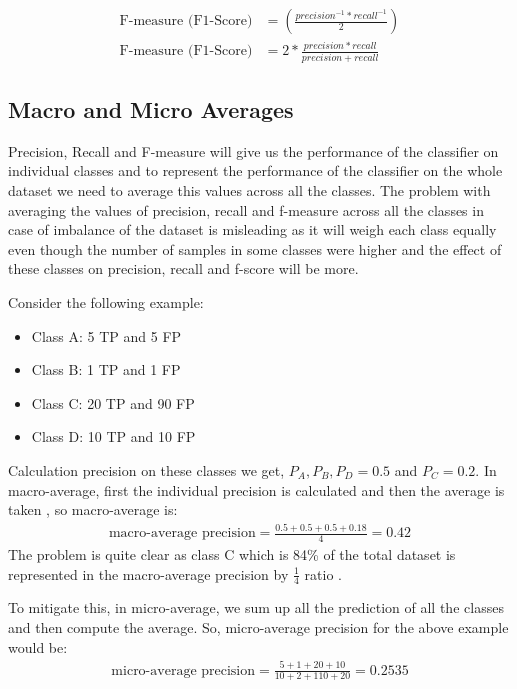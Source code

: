 \begin{align}
    \text{F-measure (F1-Score)} &= \left (\frac{precision^{-1} * recall^{-1}}{2}  \right ) \\
    \text{F-measure (F1-Score)} &= 2 * \frac{precision * recall}{precision + recall}
\end{align}

\subsection*{Macro and Micro Averages}

Precision, Recall and F-measure will give us the performance of the classifier on individual classes and to represent the performance of the classifier on the whole dataset we need to average this values across all the classes. The problem with averaging the values of precision, recall and f-measure across all the classes in case of imbalance of the dataset is misleading as it will weigh each class equally even though the number of samples in some classes were higher and the effect of these classes on precision, recall and f-score will be more. 

Consider the following example:
\begin{itemize}
    \item Class A: 5 \gls{TP} and 5 \gls{FP}
    \item Class B: 1 \gls{TP} and 1 \gls{FP}
    \item Class C: 20 \gls{TP} and 90 \gls{FP}
    \item Class D: 10 \gls{TP} and 10 \gls{FP}
\end{itemize}

Calculation precision on these classes we get, $P_{A}, P_{B}, P_{D}= 0.5$ and $P_{C} = 0.2$. 
In macro-average, first the individual precision is calculated and then the average is taken \cite{manning2009introduction}, so macro-average is:
\begin{align}
    \text{macro-average precision} = \frac{0.5+0.5+0.5+0.18}{4} = 0.42
\end{align}
The problem is quite clear as class C which is 84\% of the total dataset is represented in the macro-average precision by $\frac{1}{4}$ ratio \cite{manning2009introduction}.

To mitigate this, in micro-average, we sum up all the prediction of all the classes and then compute the average.
So, micro-average precision for the above example would be:
\begin{align}
    \text{micro-average precision} = \frac{5+1+20+10}{10+2+110+20} = 0.2535
\end{align}


